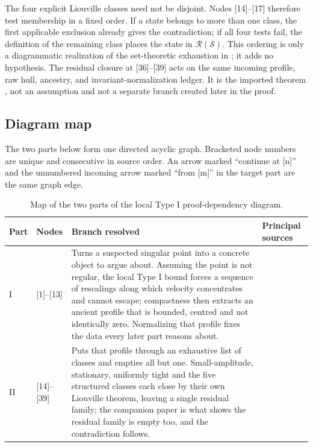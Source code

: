 \documentclass[11pt]{amsart}
\theoremstyle{plain}
\theoremstyle{definition}
\theoremstyle{remark}
\numberwithin{equation}{section}
\newcommand{\calS}{\mathcal S}
\newcommand{\calR}{\mathcal R}
\begin{document}
The four explicit Liouville classes need not be disjoint.  Nodes [14]--[17]
therefore test membership in a fixed order.  If a state belongs to more than
one class, the first applicable exclusion already gives the contradiction; if
all four tests fail, the definition of the remaining class places the state in
\(\calR(\calS)\).  This ordering is only a diagrammatic realization of the
set-theoretic exhaustion in ; it adds no hypothesis.
The residual closure at [36]--[39] acts on the same incoming profile, raw hull,
ancestry, and invariant-normalization ledger.  It is the imported theorem
, not an assumption and not a separate branch created
later in the proof.

\subsection{Diagram map}
\label{subsec:local-typeI-diagram-map}

The two parts below form one directed acyclic graph.  Bracketed node numbers
are unique and consecutive in source order.  An arrow marked ``continue at
[n]'' and the unnumbered incoming arrow marked ``from [m]'' in the target part
are the same graph edge.

\begingroup
\small
\setlength{\tabcolsep}{4pt}
\renewcommand{\arraystretch}{1.15}
\begin{longtable}{@{}C{0.52in}C{0.72in}L{2.20in}L{2.35in}@{}}
\caption{Map of the two parts of the local Type I proof-dependency diagram.}
\label{tab:local-typeI-proof-diagram-map}\\
\toprule
Part & Nodes & Branch resolved & Principal sources \\
\midrule
I & [1]--[13] & Turns a suspected singular point into a concrete object to
argue about.  Assuming the point is not regular, the local Type I bound forces a
sequence of rescalings along which velocity concentrates and cannot escape;
compactness then extracts an ancient profile that is bounded, centred and not
identically zero.  Normalizing that profile fixes the data every later part
reasons about. &
 \\
II & [14]--[39] & Puts that profile through an exhaustive list of classes and
empties all but one.  Small-amplitude, stationary, uniformly tight and the five
structured classes each close by their own Liouville theorem, leaving a single
residual family; the companion paper is what shows the residual family is empty
too, and the contradiction follows. &
 \\
\bottomrule
\end{longtable}
\endgroup
\end{document}

